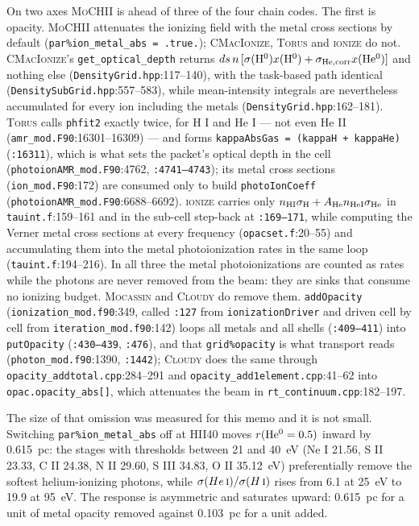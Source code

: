 \documentclass[english,a4paper]{my_memo}
\newcommand{\code}[1]{\texttt{#1}}
\newcommand{\MoCHII}{\textsc{MoCHII}}
\newcommand{\Wood}{\textsc{ionize}}
\newcommand{\CMI}{\textsc{CMacIonize}}
\newcommand{\Torus}{\textsc{Torus}}
\newcommand{\Mocassin}{\textsc{Mocassin}}
\newcommand{\Cloudy}{\textsc{Cloudy}}
\newcommand{\HI}{H\,\textsc{i}}
\newcommand{\HeI}{He\,\textsc{i}}
\begin{document}
On two axes \MoCHII{} is ahead of three of the four chain codes.  The first is
opacity.  \MoCHII{} attenuates the ionizing field with the metal cross
sections by default (\code{par\%ion\_metal\_abs = .true.}); \CMI{}, \Torus{}
and \Wood{} do not.  \CMI{}'s \code{get\_optical\_depth} returns
$ds\,n\,[\sigma({\rm H^0})x({\rm H^0})+\sigma_{\rm He,corr}x({\rm He^0})]$
and nothing else (\code{DensityGrid.hpp}:117--140), with the task-based path
identical (\code{Density\allowbreak SubGrid.hpp}:557--583), while mean-intensity integrals
are nevertheless accumulated for every ion including the metals
(\code{DensityGrid.hpp}:162--181).  \Torus{} calls \code{phfit2} exactly
twice, for H I and He I --- not even He II
(\code{amr\_mod.F90}:16301--16309) --- and forms
\code{kappaAbsGas = (kappaH + kappaHe)} (\code{:16311}), which is what sets
the packet's optical depth in the cell
(\code{photoion\allowbreak AMR\_\allowbreak mod.F90}:4762, \code{:4741--4743}); its metal cross
sections (\code{ion\_mod.F90}:172) are consumed only to build
\code{photoIonCoeff} (\code{photoion\allowbreak AMR\_\allowbreak mod.F90}:6688--6692).  \Wood{}
carries only $n_{\rm HI}\sigma_{\rm H}+A_{\rm He}n_{\rm HeI}\sigma_{\rm He}$
in \code{tauint.f}:159--161 and in the sub-cell step-back at \code{:169--171},
while computing the Verner metal cross sections at every frequency
(\code{opacset.f}:20--55) and accumulating them into the metal
photoionization rates in the same loop (\code{tauint.f}:194--216).  In all
three the metal photoionizations are counted as rates while the photons are
never removed from the beam: they are sinks that consume no ionizing budget.
\Mocassin{} and \Cloudy{} do remove them.  \code{addOpacity}
(\code{ionization\_\allowbreak mod.f90}:349, called \code{:127} from
\code{ionizationDriver} and driven cell by cell from
\code{iteration\_\allowbreak mod.f90}:142) loops all metals and all shells
(\code{:409--411}) into \code{putOpacity} (\code{:430--439}, \code{:476}),
and that \code{grid\%opacity} is what transport reads
(\code{photon\_\allowbreak mod.f90}:1390, \code{:1442}); \Cloudy{} does the same through
\code{opacity\_\allowbreak addtotal.cpp}:284--291 and
\code{opacity\_\allowbreak add1element.cpp}:41--62 into \code{opac.opacity\_abs[]}, which
attenuates the beam in \code{rt\_continuum.cpp}:182--197.

The size of that omission was measured for this memo and it is not small.
Switching \code{par\%ion\_\allowbreak metal\_\allowbreak abs} off at HII40 moves
$r({\rm He^0}=0.5)$ inward by 0.615~pc: the stages with thresholds between 21
and 40~eV (Ne I 21.56, S II 23.33, C II 24.38, N II 29.60, S III 34.83,
O II 35.12~eV) preferentially remove the softest helium-ionizing photons,
while $\sigma(\HeI{})/\sigma(\HI{})$ rises from 6.1 at 25~eV to 19.9 at
95~eV.  The response is asymmetric and saturates upward: 0.615~pc for a unit
of metal opacity removed against 0.103~pc for a unit added.
\end{document}
